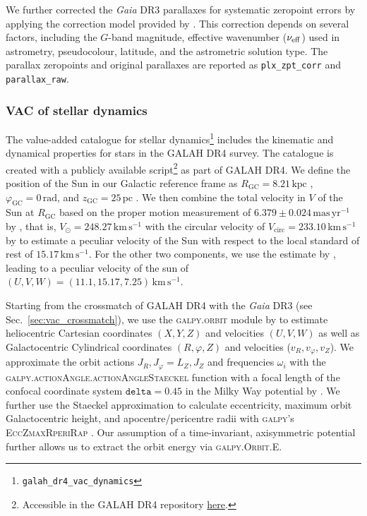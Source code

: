 \documentclass[
  journal=pasa,
  manuscript=research-paper, %
  year=2024,
  volume=37
]{cup-journal}
\newcommand{\Gaia}{\textit{Gaia}\xspace}
\begin{document}
We further corrected the \Gaia DR3 parallaxes for systematic zeropoint errors by applying the correction model provided by \citet{Lindegren2021b}. This correction depends on several factors, including the \(G\)-band magnitude, effective wavenumber (\(\nu_{\rm eff}\)) used in astrometry, pseudocolour, latitude, and the astrometric solution type. The parallax zeropoints and original parallaxes are reported as \texttt{plx\_zpt\_corr} and \texttt{parallax\_raw}.

\subsubsection{VAC of stellar dynamics}
\label{sec:vac_dynamics}

The value-added catalogue for stellar dynamics\footnote{\texttt{galah\_dr4\_vac\_dynamics}} includes the kinematic and dynamical properties for stars in the GALAH DR4 survey. The catalogue is created with a publicly available script\footnote{Accessible in the GALAH DR4 repository \href{https://github.com/svenbuder/GALAH_DR4/blob/main/catalogs/create_galah_dr4_vac_dynamics.ipynb}{here}.} as part of GALAH DR4. 
We define the position of the Sun in our Galactic reference frame as $R_\mathrm{GC} = 8.21\,\mathrm{kpc}$ \citep{McMillan2017}, $\varphi_\mathrm{GC} = 0\,\mathrm{rad}$, and $z_\mathrm{GC} = 25\,\mathrm{pc}$ \citep{BlandHawthorn_Gerhard2016}. We then combine the total velocity  in $V$ of the Sun at $R_\mathrm{GC}$ based on the proper motion measurement of $6.379\pm0.024\,\mathrm{mas\,yr^{-1}}$ by \citep{Reid2004}, that is, $V_\odot = 248.27\,\mathrm{km\,s^{-1}}$ with the circular velocity of $V_\mathrm{circ} = 233.10\,\mathrm{km\,s^{-1}}$ by \citet{McMillan2017} to estimate a peculiar velocity of the Sun with respect to the local standard of rest of  $15.17\,\mathrm{km\,s^{-1}}$. For the other two components, we use the estimate by \citet{Schoenrich2010}, leading to a peculiar velocity of the sun of $(U,V,W) = (11.1, 15.17, 7.25)\,\mathrm{km\,s^{-1}}$.

Starting from the crossmatch of GALAH DR4 with the \Gaia DR3 (see Sec.~\ref{sec:vac_crossmatch}), we use the \textsc{galpy.orbit} module by \citet{Bovy2015} to estimate heliocentric Cartesian coordinates $(X,Y,Z)$ and velocities $(U,V,W)$ as well as Galactocentric Cylindrical coordinates $(R, \varphi, Z)$ and velocities ($v_R, v_\varphi, v_Z$). We approximate the orbit actions $J_R, J_\varphi = L_Z, J_Z$ and frequencies $\omega_i$ with the \textsc{galpy.actionAngle.actionAngleStaeckel} function with a focal length of the confocal coordinate system $\texttt{delta} = 0.45$ in the Milky Way potential by \citet{McMillan2017}. We further use the Staeckel approximation \citep{Binney2012} to calculate eccentricity, maximum orbit Galactocentric height, and apocentre/pericentre radii with \textsc{galpy}'s \textsc{EccZmaxRperiRap} \citep{Mackereth2018}. Our assumption of a time-invariant, axisymmetric potential further allows us to extract the orbit energy via \textsc{galpy.Orbit.E}.
\end{document}
